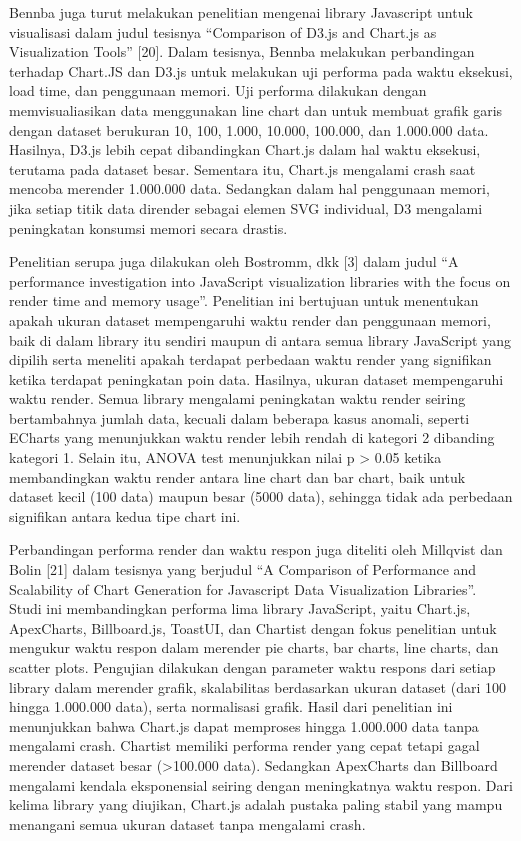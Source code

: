Bennba juga turut melakukan penelitian mengenai library Javascript untuk visualisasi dalam judul tesisnya “Comparison of D3.js and Chart.js as Visualization Tools” [20]. Dalam tesisnya, Bennba melakukan perbandingan terhadap Chart.JS dan D3.js untuk melakukan uji performa pada waktu eksekusi, load time, dan penggunaan memori. Uji performa dilakukan dengan memvisualiasikan data menggunakan line chart dan untuk membuat grafik garis dengan dataset berukuran 10, 100, 1.000, 10.000, 100.000, dan 1.000.000 data. Hasilnya, D3.js lebih cepat dibandingkan Chart.js dalam hal waktu eksekusi, terutama pada dataset besar. Sementara itu, Chart.js mengalami crash saat mencoba merender 1.000.000 data. Sedangkan dalam hal penggunaan memori, jika setiap titik data dirender sebagai elemen SVG individual, D3 mengalami  peningkatan konsumsi memori secara drastis.

Penelitian serupa juga dilakukan oleh Bostromm, dkk [3] dalam judul “A performance investigation into JavaScript visualization libraries with the focus on render time and memory usage”. Penelitian ini bertujuan untuk menentukan apakah ukuran dataset mempengaruhi waktu render dan penggunaan memori, baik di dalam library itu sendiri maupun di antara semua library JavaScript yang dipilih serta meneliti apakah terdapat perbedaan waktu render yang signifikan ketika terdapat peningkatan poin data. Hasilnya, ukuran dataset mempengaruhi waktu render. Semua library mengalami peningkatan waktu render seiring bertambahnya jumlah data, kecuali dalam beberapa kasus anomali, seperti ECharts yang menunjukkan waktu render lebih rendah di kategori 2 dibanding kategori 1. Selain itu, ANOVA test menunjukkan nilai p > 0.05 ketika membandingkan waktu render antara line chart dan bar chart, baik untuk dataset kecil (100 data) maupun besar (5000 data), sehingga tidak ada perbedaan signifikan antara kedua tipe chart ini. 

Perbandingan performa render dan waktu respon juga diteliti oleh Millqvist dan Bolin [21] dalam tesisnya yang berjudul “A Comparison of Performance and Scalability of Chart Generation for Javascript Data Visualization Libraries”. Studi ini membandingkan performa lima library JavaScript, yaitu Chart.js, ApexCharts, Billboard.js, ToastUI, dan Chartist dengan fokus penelitian untuk mengukur waktu respon dalam merender pie charts, bar charts, line charts, dan scatter plots. Pengujian dilakukan dengan parameter waktu respons dari setiap library dalam merender grafik, skalabilitas berdasarkan ukuran dataset (dari 100 hingga 1.000.000 data), serta normalisasi grafik. Hasil dari penelitian ini menunjukkan bahwa Chart.js dapat memproses hingga 1.000.000 data tanpa mengalami crash. Chartist memiliki performa render yang cepat tetapi gagal merender dataset besar (>100.000 data). Sedangkan ApexCharts dan Billboard mengalami kendala eksponensial seiring dengan meningkatnya waktu respon. Dari kelima library yang diujikan, Chart.js adalah pustaka paling stabil yang mampu menangani semua ukuran dataset tanpa mengalami crash. 

